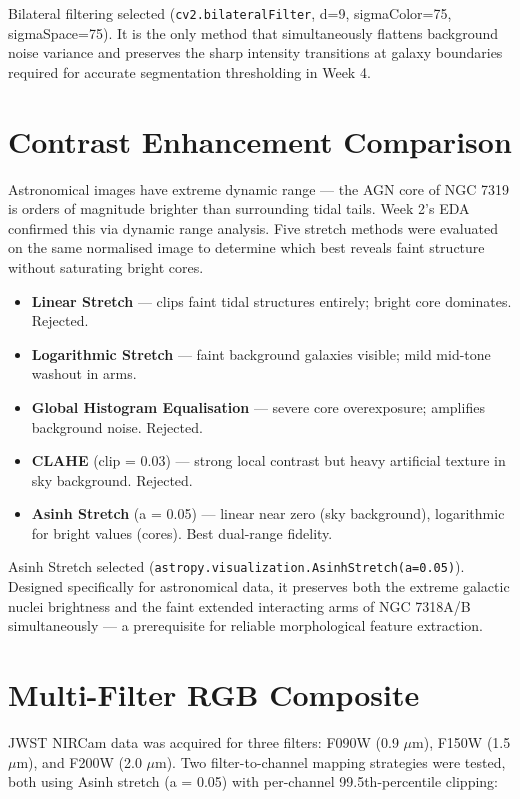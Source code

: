 \documentclass[11pt]{article}
\begin{document}
Bilateral filtering selected (\texttt{cv2.bilateralFilter}, d=9, sigmaColor=75, sigmaSpace=75). It is the only method that simultaneously flattens background noise variance and preserves the sharp intensity transitions at galaxy boundaries required for accurate segmentation thresholding in Week 4.

\section{Contrast Enhancement Comparison}
Astronomical images have extreme dynamic range --- the AGN core of NGC 7319 is orders of magnitude brighter than surrounding tidal tails. Week 2's EDA confirmed this via dynamic range analysis. Five stretch methods were evaluated on the same normalised image to determine which best reveals faint structure without saturating bright cores.

\begin{itemize}
    \item \textbf{Linear Stretch} --- clips faint tidal structures entirely; bright core dominates. Rejected.
    \item \textbf{Logarithmic Stretch} --- faint background galaxies visible; mild mid-tone washout in arms.
    \item \textbf{Global Histogram Equalisation} --- severe core overexposure; amplifies background noise. Rejected.
    \item \textbf{CLAHE} (clip = 0.03) --- strong local contrast but heavy artificial texture in sky background. Rejected.
    \item \textbf{Asinh Stretch} (a = 0.05) --- linear near zero (sky background), logarithmic for bright values (cores). Best dual-range fidelity.
\end{itemize}

Asinh Stretch selected (\texttt{astropy.visualization.AsinhStretch(a=0.05)}). Designed specifically for astronomical data, it preserves both the extreme galactic nuclei brightness and the faint extended interacting arms of NGC 7318A/B simultaneously --- a prerequisite for reliable morphological feature extraction.

\section{Multi-Filter RGB Composite}
JWST NIRCam data was acquired for three filters: F090W (0.9 $\mu$m), F150W (1.5 $\mu$m), and F200W (2.0 $\mu$m). Two filter-to-channel mapping strategies were tested, both using Asinh stretch (a = 0.05) with per-channel 99.5th-percentile clipping:
\end{document}
